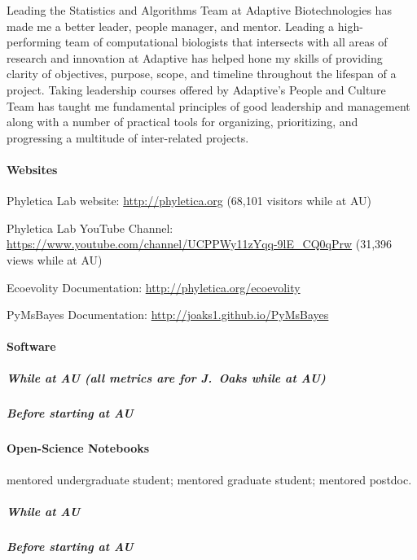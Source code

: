 Leading the Statistics and Algorithms Team at Adaptive Biotechnologies has made
me a better leader, people manager, and mentor.
Leading a high-performing team of computational biologists that intersects with
all areas of research and innovation at Adaptive has helped hone my skills of
providing clarity of objectives, purpose, scope, and timeline throughout the
lifespan of a project.
Taking leadership courses offered by Adaptive's People and Culture Team
has taught me fundamental principles of good leadership and management along
with a number of practical tools for organizing, prioritizing, and progressing
a multitude of inter-related projects.
 
\paragraph{Websites}
\begin{tightItemize}
    \item Phyletica Lab website: \url{http://phyletica.org} (68,101 visitors while at AU)
    \item Phyletica Lab YouTube Channel: \url{https://www.youtube.com/channel/UCPPWy11zYqq-9lE_CQ0qPrw} (31,396 views while at AU)
    \item Ecoevolity Documentation: \url{http://phyletica.org/ecoevolity}
    \item PyMsBayes Documentation: \url{http://joaks1.github.io/PyMsBayes}
\end{tightItemize}

\paragraph{Software}
\subparagraph*{While at AU (all metrics are for J.\ Oaks while at AU)}


\subparagraph*{Before starting at AU}


\paragraph{Open-Science Notebooks}
\ugsymbol{}mentored undergraduate student;
\phdsymbol{}mentored graduate student;
\postdocsymbol{}mentored postdoc.
\subparagraph{While at AU}
\nocite{*}
\printbibliography[filter=openscinotebooks, check=afteraustart, heading=none]

\subparagraph{Before starting at AU}
\nocite{*}
\printbibliography[filter=openscinotebooks, check=beforeaustart, heading=none]

